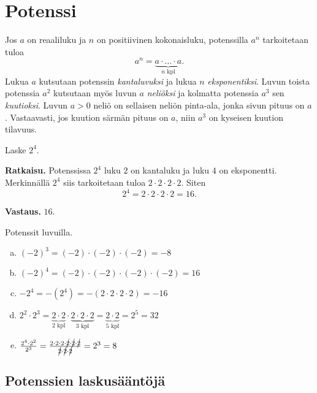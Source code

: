 \chapter{Potenssi}
    
    Jos $a$ on reaaliluku ja $n$ on positiivinen kokonaisluku, potenssilla $a^n$ tarkoitetaan tuloa
    \[
        a^n = \underbrace{a\cdot \ldots \cdot a}_{n\text{ kpl}}. 
    \]
    Lukua $a$ kutsutaan potenssin \emph{kantaluvuksi} ja lukua $n$ \emph{eksponentiksi}. Luvun toista potenssia $a^2$ kutsutaan myös luvun $a$ \emph{neliöksi} ja kolmatta potenssia $a^3$ sen \emph{kuutioksi}. Luvun $a>0$ neliö on sellaisen neliön pinta-ala, jonka sivun pituus on $a$. Vastaavasti, jos kuution särmän pituus on $a$, niin $a^3$ on kyseisen kuution tilavuus.
    
    \begin{esimerkki}
        Laske $2^4$.
        
        \textbf{Ratkaisu.}
        Potenssissa $2^4$ luku $2$ on kantaluku ja luku $4$ on eksponentti.
        Merkinnällä $2^4$ siis tarkoitetaan tuloa $2\cdot 2\cdot 2\cdot 2$. Siten
        \[
            2^4=2\cdot 2\cdot 2\cdot 2=16.
        \]
        
        \textbf{Vastaus.} $16$.
    \end{esimerkki}
            
    \begin{esimerkki}
        Potenssit luvuilla.
        \begin{enumerate}[a)]
            \item $(-2)^3 = (-2)\cdot (-2)\cdot (-2) = -8$
            \item $(-2)^4 = (-2)\cdot (-2)\cdot (-2)\cdot (-2) = 16$
            \item $-2^4   = -(2^4) = -(2\cdot 2\cdot 2\cdot 2) = -16$
            \item $2^2\cdot 2^3 =
                \underbrace{2\cdot 2}_{\text{$2$ kpl}}\cdot \underbrace{2\cdot
                2\cdot 2}_{\text{$3$ kpl}} = \underbrace{2\cdot 2}_{\text{$5$ kpl}}=2^5 = 32$
            \item $\frac{2^4\cdot 2^2}{2^3} =
                \frac{2\cdot 2\cdot 2\cdot \cancel{2} \cdot \cancel{2}\cdot
                \cancel{2}}{\cancel{2}\cdot \cancel{2}\cdot \cancel{2}} = 2^3 = 8$
        \end{enumerate}
    \end{esimerkki}
    
\section*{Potenssien laskusääntöjä}
    

